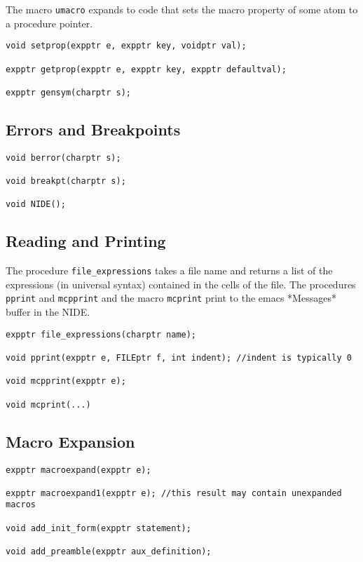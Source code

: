 \documentclass{article}
\begin{document}
The macro {\tt umacro} expands to code that
sets the macro property of some atom to a procedure pointer.

\begin{verbatim}
void setprop(expptr e, expptr key, voidptr val);

expptr getprop(expptr e, expptr key, expptr defaultval);

expptr gensym(charptr s);
\end{verbatim}

\subsection{Errors and Breakpoints}

\begin{verbatim}
void berror(charptr s);

void breakpt(charptr s);

void NIDE();
\end{verbatim}

\subsection{Reading and Printing}
The procedure {\tt file\_expressions} takes a file name and returns a
list of the expressions (in universal syntax) contained in the cells
of the file.  The procedures {\tt pprint} and {\tt mcpprint} and the macro {\tt mcprint} print to the emacs *Messages* buffer in
the NIDE.

\begin{verbatim}
expptr file_expressions(charptr name);

void pprint(expptr e, FILEptr f, int indent); //indent is typically 0

void mcpprint(expptr e);

void mcprint(...)
\end{verbatim}

\subsection{Macro Expansion}

\begin{verbatim}
expptr macroexpand(expptr e);

expptr macroexpand1(expptr e); //this result may contain unexpanded macros

void add_init_form(expptr statement);

void add_preamble(expptr aux_definition);
\end{verbatim}
\end{document}
